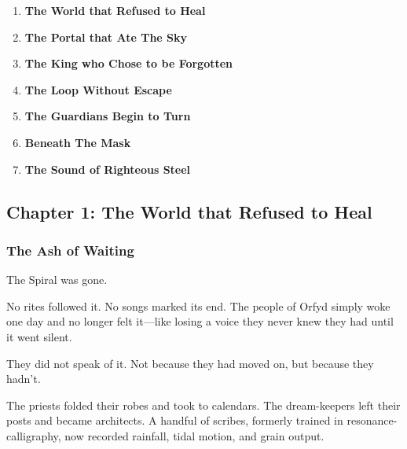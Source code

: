 \documentclass[12pt]{article}
\begin{document}
\begin{enumerate}
    \item \textbf{The World that Refused to Heal} 

    \vspace{1em}
    \item \textbf{The Portal that Ate The Sky} 

    \vspace{1em}
    \item \textbf{The King who Chose to be Forgotten} 

    \vspace{1em}
    \item \textbf{The Loop Without Escape} 

    \vspace{1em}
    \item \textbf{The Guardians Begin to Turn} 

    \vspace{1em}
    \item \textbf{Beneath The Mask}

    \vspace{1em}
    \item \textbf{The Sound of Righteous Steel} 

\end{enumerate}

\newpage

\subsection*{Chapter 1: The World that Refused to Heal}

\vspace{.5in}

\subsubsection*{The Ash of Waiting}

The Spiral was gone.

\vspace{0.5em}
No rites followed it. No songs marked its end. The people of Orfyd simply woke one day and no longer felt it---like losing a voice they never knew they had until it went silent.

\vspace{0.5em}
They did not speak of it. Not because they had moved on, but because they hadn't.

\vspace{0.5em}
The priests folded their robes and took to calendars. The dream-keepers left their posts and became architects. A handful of scribes, formerly trained in resonance-calligraphy, now recorded rainfall, tidal motion, and grain output.
\end{document}
